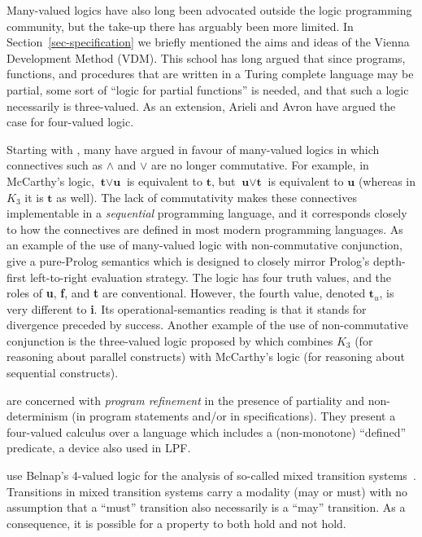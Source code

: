 \documentclass{tlp}
\begin{document}
Many-valued logics have also long been advocated outside 
the logic programming community, but
the take-up there has arguably been more limited. 
In Section~\ref{sec-specification} we briefly mentioned the aims and
ideas of the Vienna Development Method (VDM).
This school has long argued that since programs, functions, and 
procedures that are written in a Turing complete language may be partial,
some sort of ``logic for partial functions'' is needed,
and that such a logic necessarily is three-valued.
As an extension,
Arieli and Avron
\citeyear{arieli-avron:1996,arieli-avron:LICS1998}
have argued the case for four-valued logic.

Starting with ,
many have argued in favour of many-valued logics in which connectives
such as $\land$ and $\lor$ are no longer commutative.
For example, in McCarthy's logic, $\textbf{t} \lor \textbf{u}$ is 
equivalent to $\textbf{t}$, but
$\textbf{u} \lor \textbf{t}$ is equivalent to $\textbf{u}$ 
(whereas in $K_3$ it is $\textbf{t}$ as well).
The lack of commutativity makes these connectives implementable in 
a \emph{sequential} programming language,
and it corresponds closely to how the connectives are defined in
most modern programming languages.
As an example of the use of many-valued logic with non-commutative
conjunction,  give a pure-Prolog semantics 
which is designed to closely mirror Prolog's depth-first left-to-right
evaluation strategy.
The logic has four truth values, and the roles of \textbf{u},
\textbf{f}, and \textbf{t} are conventional.
However, the fourth value, denoted $\textbf{t}_u$, is very different
to \textbf{i}.
Its operational-semantics reading is that it stands for
divergence preceded by success.
Another example of the use of non-commutative conjunction is
the three-valued logic proposed by 
which combines $K_3$ (for reasoning about parallel constructs)
with McCarthy's logic (for reasoning about sequential constructs).

 are concerned with 
\emph{program refinement}
in the presence of partiality and non-determinism 
(in program statements and/or in specifications).
They present a four-valued calculus over a language which includes
a (non-monotone) ``defined'' predicate, a device also used in LPF.

 use Belnap's 4-valued logic for the
analysis of so-called mixed transition systems~\cite{Dams-Toplas:1997}.
Transitions in mixed transition systems carry a modality (may or must)
with no assumption that a ``must'' transition also necessarily is a
``may'' transition.
As a consequence, it is possible for a property to both hold and not
hold.
\end{document}

